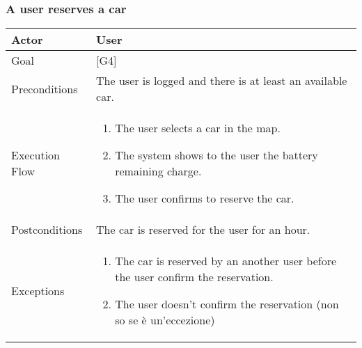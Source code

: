 \documentclass{article}
\begin{document}
	\subsubsection{A user reserves a car}
	\begin{tabularx}{\textwidth}{  l  X  }
		\hline
		Actor & User\\
		\hline
		Goal & [G4]\\
		\hline
		Preconditions & The user is logged and there is at least an available car.\\
		\hline
		Execution Flow & \begin{enumerate}
			\item{The user selects a car in the map.}
										 \item{The system shows to the user the battery remaining charge.}
										 \item{The user confirms to reserve the car.}
										\end{enumerate}\\
		\hline
		Postconditions & The car is reserved for the user for an hour. \\
		\hline
		Exceptions & \begin{enumerate}
			\item{The car is reserved by an another user before the user confirm the reservation.}
								 \item{The user doesn't confirm the reservation (non so se è un'eccezione)}
								\end{enumerate}\\
		\hline
	\end{tabularx}
\end{document}
